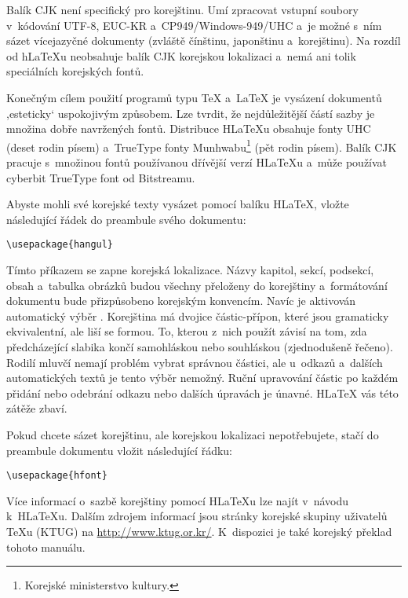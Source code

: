 \begin{enumerate}
Balík CJK není specifický pro korejštinu. Umí zpracovat vstupní soubory
v~kódování UTF-8, EUC-KR a~CP949/Windows-949/UHC a~je možné s~ním
sázet vícejazyčné dokumenty (zvláště čínštinu, japonštinu a~korejštinu).
Na rozdíl od h\LaTeX u neobsahuje balík CJK korejskou lokalizaci a~nemá
ani tolik speciálních korejských fontů.

Konečným cílem použití programů typu \TeX{} a~\LaTeX{} je vysázení dokumentů
,esteticky` uspokojivým způsobem. Lze tvrdit, že nejdůležitější částí
sazby je množina dobře navržených fontů. Distribuce H\LaTeX u obsahuje
fonty UHC \PSi{} (deset rodin písem)
a~TrueType fonty Munhwabu\footnote{Korejské ministerstvo kultury.}
(pět rodin písem). Balík CJK pracuje s~množinou fontů používanou
dřívější verzí H\LaTeX u a~může používat cyberbit TrueType font
od Bitstreamu.
\end{enumerate}

Abyste mohli své korejské texty vysázet pomocí balíku H\LaTeX,
vložte následující řádek do preambule svého dokumentu:
\begin{lscommand}
\verb+\usepackage{hangul}+
\end{lscommand}

Tímto příkazem se zapne korejská lokalizace. Názvy kapitol, sekcí,
podsekcí, obsah a~tabulka obrázků budou všechny přeloženy do korejštiny
a~formátování dokumentu bude přizpůsobeno korejským konvencím. Navíc
je aktivován automatický výběr . Korejština
má dvojice částic-přípon, které jsou gramaticky ekvivalentní, ale
liší se formou. To, kterou z~nich použít závisí na tom, zda předcházející
slabika končí samohláskou nebo souhláskou (zjednodušeně řečeno).
Rodilí mluvčí nemají problém vybrat správnou částici, ale u~odkazů
a~dalších automatických textů je tento výběr nemožný. Ruční upravování
částic po každém přidání nebo odebrání odkazu nebo dalších úpravách
je únavné. H\LaTeX{} vás této zátěže zbaví.

Pokud chcete sázet korejštinu, ale korejskou lokalizaci nepotřebujete,
stačí do preambule dokumentu vložit následující řádku:

\begin{lscommand}
\verb+\usepackage{hfont}+
\end{lscommand}

Více informací o~sazbě korejštiny pomocí H\LaTeX u lze najít
v~návodu k~H\LaTeX u. Dalším zdrojem informací jsou stránky
korejské skupiny uživatelů \TeX u (KTUG) na \url{http://www.ktug.or.kr/}.
K~dispozici je také korejský překlad tohoto manuálu.

